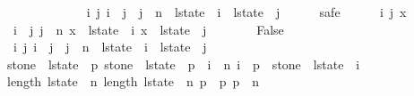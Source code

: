 \begin{isabellebody}
\ \ \ \ \isamarkupfalse%
\isanewline
\ \ \isamarkupfalse%
\isanewline
\isanewline
\ \ \isamarkupfalse%
\isanewline
\isanewline
\ \ \isamarkupfalse%
\ {\isachardoublequoteopen}{\isasymforall}i\ j{\isachardot}\ i\ {\isacharless}\ j\ {\isasymand}\ j\ {\isasymle}\ n\ {\isasymlongrightarrow}\ l{\isacharunderscore}state{\isacharprime}\ {\isacharbang}\ i\ {\isasyminter}\ l{\isacharunderscore}state{\isacharprime}\ {\isacharbang}\ j\ {\isacharequal}\ {\isacharbraceleft}{\isacharbraceright}{\isachardoublequoteclose}\isanewline
\ \ \isamarkupfalse%
\ safe\isanewline
\ \ \ \ \isamarkupfalse%
\ i\ j\ x\isanewline
\ \ \ \ \isamarkupfalse%
\ {\isacharasterisk}{\isacharasterisk}{\isacharasterisk}{\isacharcolon}\ {\isachardoublequoteopen}i\ {\isacharless}\ j{\isachardoublequoteclose}\ {\isachardoublequoteopen}j\ {\isasymle}\ n{\isachardoublequoteclose}\ {\isachardoublequoteopen}x\ {\isasymin}\ l{\isacharunderscore}state{\isacharprime}\ {\isacharbang}\ i{\isachardoublequoteclose}\ {\isachardoublequoteopen}x\ {\isasymin}\ l{\isacharunderscore}state{\isacharprime}\ {\isacharbang}\ j{\isachardoublequoteclose}\isanewline
\ \ \ \ \isamarkupfalse%
\ \isamarkupfalse%
\ False\isanewline
\ \ \ \ \ \ \isamarkupfalse%
\ {\isacharasterisk}\ {\isacharbackquoteopen}{\isasymforall}i\ j{\isachardot}\ i\ {\isacharless}\ j\ {\isasymand}\ j\ {\isasymle}\ n\ {\isasymlongrightarrow}\ l{\isacharunderscore}state\ {\isacharbang}\ i\ {\isasyminter}\ l{\isacharunderscore}state\ {\isacharbang}\ j\ {\isacharequal}\ {\isacharbraceleft}{\isacharbraceright}{\isacharbackquoteclose}\isanewline
\ \ \ \ \ \ \isamarkupfalse%
\ {\isacharbackquoteopen}stone\ {\isasymin}\ l{\isacharunderscore}state\ {\isacharbang}\ p{}{\isacharbackquoteclose}\ {\isacharbackquoteopen}stone\ {\isasymnotin}\ l{\isacharunderscore}state\ {\isacharbang}\ p{}{\isacharbackquoteclose}\ {\isacharbackquoteopen}{\isasymforall}\ i\ {\isasymle}\ n{\isachardot}\ i\ {\isasymnoteq}\ p{}\ {\isasymlongrightarrow}\ stone\ {\isasymnotin}\ l{\isacharunderscore}state\ {\isacharbang}\ i{\isacharbackquoteclose}\isanewline
\ \ \ \ \ \ \isamarkupfalse%
\ {\isacharbackquoteopen}length\ l{\isacharunderscore}state\ {\isacharequal}\ n{\isacharplus}{}{\isacharbackquoteclose}\ {\isacharbackquoteopen}length\ l{\isacharunderscore}state{\isacharprime}\ {\isacharequal}\ n{\isacharplus}{}{\isacharbackquoteclose}\ {\isacharbackquoteopen}p{}\ {\isacharless}\ p{}{\isacharbackquoteclose}\ {\isacharbackquoteopen}p{}\ {\isasymle}\ n{\isacharbackquoteclose}\ \isanewline

\end{isabellebody}
